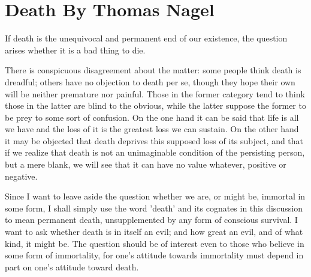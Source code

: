 \chapter{Death By Thomas Nagel}\autocite{Nagel2}
\label{death}
\setcounter{fa}{\thefootnote}
\setcounter{footnote}{0}
If death is the unequivocal and permanent end of our existence, the question
arises whether it is a bad thing to die.

There is conspicuous disagreement about the matter: some people think death
is dreadful; others have no objection to death per se, though they hope their
own will be neither premature nor painful. Those in the former category tend to
think those in the latter are blind to the obvious, while the latter suppose the
former to be prey to some sort of confusion. On the one hand it can be said
that life is all we have and the loss of it is the greatest loss we can sustain. On
the other hand it may be objected that death deprives this supposed loss of its
subject, and that if we realize that death is not an unimaginable condition of the
persisting person, but a mere blank, we will see that it can have no value
whatever, positive or negative.

Since I want to leave aside the question whether we are, or might be, immortal
in some form, I shall simply use the word 'death' and its cognates in this
discussion to mean permanent death, unsupplemented by any form of
conscious survival. I want to ask whether death is in itself an evil; and how great
an evil, and of what kind, it might be. The question should be of interest even
to those who believe in some form of immortality, for one's attitude towards
immortality must depend in part on one's attitude toward death.

